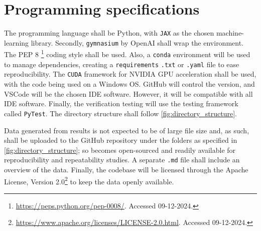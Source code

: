 \section{Programming specifications}
\label{sec:programming_defs}

The programming language shall be Python, with \texttt{JAX} as the chosen machine-learning library. Secondly, \texttt{gymnasium} by OpenAI shall wrap the environment. The PEP 8 \footnote{\url{https://peps.python.org/pep-0008/}. Accessed 09-12-2024.} coding style shall be used. Also, a \texttt{conda} environment will be used to manage dependencies, creating a \texttt{requirements} \texttt{.txt} or \texttt{.yaml} file to ease reproducibility. The \texttt{CUDA} framework for NVIDIA GPU acceleration shall be used, with the code being used on a Windows OS. GitHub will control the version, and VSCode will be the chosen IDE software. However, it will be compatible with all IDE software. Finally, the verification testing will use the testing framework called \texttt{PyTest}. The directory structure shall follow \autoref{fig:directory_structure}.

Data generated from results is not expected to be of large file size and, as such, shall be uploaded to the GitHub repository under the folders as specified in \autoref{fig:directory_structure}; so becomes open-sourced and readily available for reproducibility and repeatability studies. A separate \texttt{.md} file shall include an overview of the data. Finally, the codebase will be licensed through the Apache License, Version 2.0\footnote{\url{https://www.apache.org/licenses/LICENSE-2.0.html}. Accessed 09-12-2024.} to keep the data openly available.

